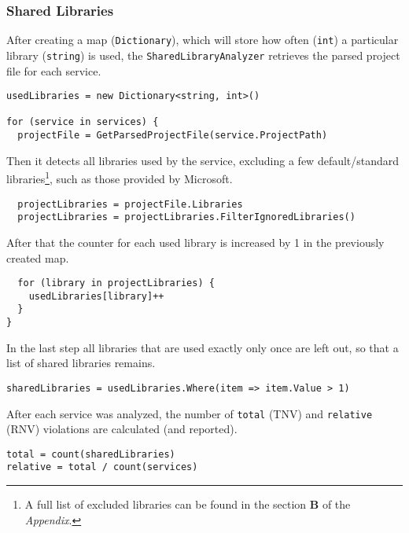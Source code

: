\documentclass{article}
\begin{document}
\subsubsection{Shared Libraries}
After creating a map (\lstinline{Dictionary}), which will store how often (\lstinline{int}) a particular library (\lstinline{string}) is used, the \lstinline{SharedLibraryAnalyzer} retrieves the parsed project file for each service.
\begin{lstlisting}
usedLibraries = new Dictionary<string, int>()

for (service in services) {
  projectFile = GetParsedProjectFile(service.ProjectPath)
\end{lstlisting}
Then it detects all libraries used by the service, excluding a few default/standard libraries\footnote{A full list of excluded libraries can be found in the section \textbf{B} of the \textit{Appendix}.}, such as those provided by Microsoft.
\begin{lstlisting}
  projectLibraries = projectFile.Libraries
  projectLibraries = projectLibraries.FilterIgnoredLibraries()
\end{lstlisting}
After that the counter for each used library is increased by 1 in the previously created map.
\begin{lstlisting}
  for (library in projectLibraries) {
    usedLibraries[library]++
  }
}
\end{lstlisting}
In the last step all libraries that are used exactly only once are left out, so that a list of shared libraries remains.
\begin{lstlisting}
sharedLibraries = usedLibraries.Where(item => item.Value > 1)
\end{lstlisting}
After each service was analyzed, the number of \lstinline{total} (TNV) and \lstinline{relative} (RNV) violations are calculated (and reported).
\begin{lstlisting}
total = count(sharedLibraries)
relative = total / count(services)
\end{lstlisting}
\end{document}
